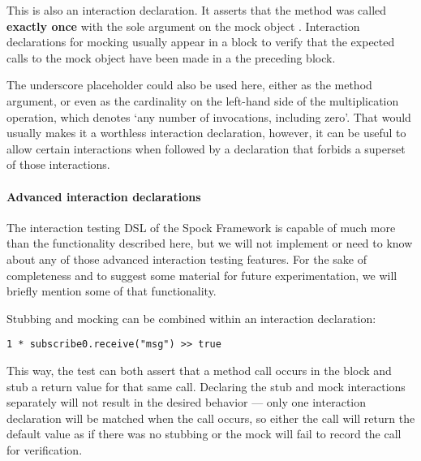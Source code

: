 This is also an interaction declaration. It asserts that
the method  was called \textbf{exactly once} with
the sole argument  on
the mock object .
Interaction declarations for mocking usually appear in a  block
to verify that the expected calls to the mock object
have been made in a the preceding  block.

The underscore placeholder could also be used here,
either as the method argument,
or even as the cardinality
on the left-hand side of the multiplication operation,
which denotes `any number of invocations, including zero'.
That would usually makes it a worthless interaction declaration,
however, it can be useful to allow certain interactions when followed by
a declaration that forbids a superset of those interactions.
\autocite[Chapter: Interaction Based Testing - Mocking - Strict Mocking]{SpockFrameworkDoc}

\paragraph{Advanced interaction declarations}
The interaction testing DSL of the Spock Framework
is capable of much more than the functionality described here,
but we will not implement or need to know about any of
those advanced interaction testing features.
For the sake of completeness
and to suggest some material for future experimentation,
we will briefly mention some of that functionality.

Stubbing and mocking can be combined
within an interaction declaration:
\begin{verbatim}
1 * subscribe0.receive("msg") >> true
\end{verbatim}
This way, the test can both assert that
a method call occurs in the  block and
stub a return value for that same call.
Declaring the stub and mock interactions separately
will not result in the desired behavior ---
only one interaction declaration will be matched when the call occurs,
\autocite[Chapter: Interaction Based Testing - Combining Mocking and Stubbing]{SpockFrameworkDoc}
so either the call will return the default value as if there was no stubbing or
the mock will fail to record the call for verification.

